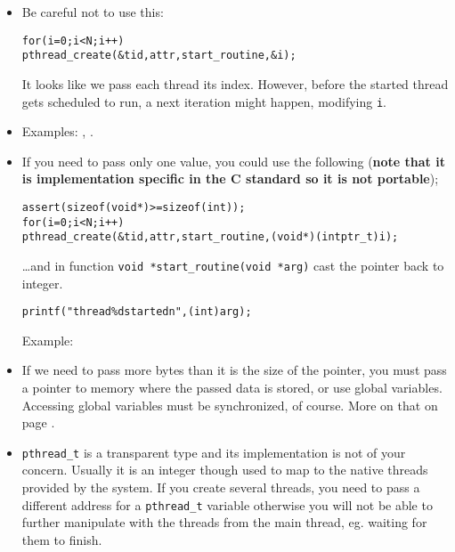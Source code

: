 \begin{itemize}
\item Be careful not to use this:
\begin{alltt}
for (i = 0; i < N; i++)
    pthread\_create(&tid, attr, start\_routine, &i);
\end{alltt}

It looks like we pass each thread its index.  However, before the started thread
gets scheduled to run, a next iteration might happen, modifying \texttt{i}.
\item \label{WRONG_USE_OF_ARG} Examples: ,
.
\item If you need to pass only one value, you could use the following
(\textbf{note that it is implementation specific in the C standard so it is not
portable});

\begin{alltt}
assert(sizeof (void *) >= sizeof (int));
for (i = 0; i < N; i++)
    pthread\_create(&tid, attr, start\_routine, (void *)(intptr\_t)i);
\end{alltt}

\dots and in function \texttt{void *start\_routine(void *arg)} cast the pointer
back to integer.

\begin{alltt}
printf("thread \%d started\bs{}n", (int)arg);
\end{alltt}

\label{INT_AS_ARG} Example: 
\item If we need to pass more bytes than it is the size of the pointer, you must
pass a pointer to memory where the passed data is stored, or use global
variables.  Accessing global variables must be synchronized, of course.  More on
that on page \pageref{THREADSYNCHRONIZATION}.
\item \label{PTHREAD_CREATE_CYCLE} \texttt{pthread\_t} is a transparent type and
its implementation is not of your concern.  Usually it is an integer though used
to map to the native threads provided by the system.  If you create several
threads, you need to pass a different address for a \texttt{pthread\_t} variable
otherwise you will not be able to further manipulate with the threads from the
main thread, eg. waiting for them to finish.
\end{itemize}


\label{THREAD_ATTRS}

